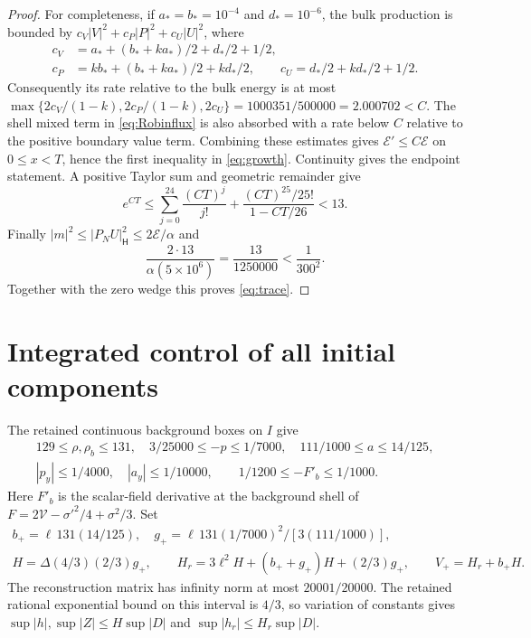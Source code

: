 \documentclass[11pt]{article}
\newcommand{\cV}{\mathcal V}
\newcommand{\HH}{\mathsf H}
\newcommand{\PN}{P_N}
\begin{document}
\begin{proof}
For completeness, if $a_*=b_*=10^{-4}$ and $d_*=10^{-6}$, the bulk
production is bounded by
$c_V|V|^2+c_P|P|^2+c_U|U|^2$, where
\begin{align}
 c_V&=a_*+(b_*+ka_*)/2+d_*/2+1/2,\nonumber\\
 c_P&=kb_*+(b_*+ka_*)/2+kd_*/2,\qquad
 c_U=d_*/2+kd_*/2+1/2.
 \label{eq:bulkconstants}
\end{align}
Consequently its rate relative to the bulk energy is at most
$\max\{2c_V/(1-k),2c_P/(1-k),2c_U\}
=1000351/500000=2.000702<C$. The shell mixed term in
\eqref{eq:Robinflux} is also absorbed with a rate below $C$ relative to
the positive boundary value term. Combining these estimates gives
$\mathcal E'\le C\mathcal E$ on $0\le x<T$, hence the first inequality
in \eqref{eq:growth}. Continuity gives the endpoint statement.
A positive Taylor sum and geometric remainder give
\begin{equation}
 e^{CT}\le\sum_{j=0}^{24}\frac{(CT)^j}{j!}
       +\frac{(CT)^{25}/25!}{1-CT/26}<13.
 \label{eq:exp}
\end{equation}
Finally $|m|^2\le|\PN U|_{\HH}^2\le2\mathcal E/\alpha$ and
\begin{equation}
 \frac{2\cdot13}{\alpha(5\times10^6)}
       =\frac{13}{1250000}<\frac1{300^2}.
 \label{eq:tracesquare}
\end{equation}
Together with the zero wedge this proves \eqref{eq:trace}.
\end{proof}

\section{Integrated control of all initial components}\label{sec:initial}

The retained continuous background boxes on $I$ give
\begin{gather}
129\le\rho,\rho_b\le131,\quad
3/25000\le-p\le1/7000,\quad111/1000\le a\le14/125,\nonumber\\
|p_y|\le1/4000,\quad|a_y|\le1/10000,\qquad
1/1200\le-F'_b\le1/1000.
\label{eq:caps}
\end{gather}
Here $F'_b$ is the scalar-field derivative at the background shell of
$F=2\cV-\sigma'^2/4+\sigma^2/3$.
Set
\begin{gather}
 b_+=\ell\,131(14/125),\quad
 g_+=\ell\,131(1/7000)^2/[3(111/1000)],\nonumber\\
 H=\Delta(4/3)(2/3)g_+,\qquad
 H_r=3\ell^2H+(b_++g_+)H+(2/3)g_+,\qquad
 V_+=H_r+b_+H.
 \label{eq:ODEcaps}
\end{gather}
The reconstruction matrix has infinity norm at most $20001/20000$.
The retained rational exponential bound on this interval is $4/3$,
so variation of constants gives
$\sup|h|,\sup|Z|\le H\sup|D|$ and
$\sup|h_r|\le H_r\sup|D|$.
\end{document}
